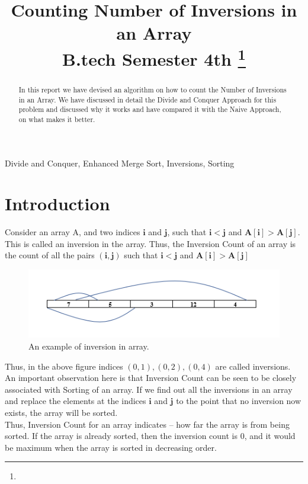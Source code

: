 \documentclass[conference]{IEEEtran}
\begin{document}
\title{Counting Number of Inversions in an Array\\
{\footnotesize B.tech Semester 4th}
\thanks{}
}

\author{
\and
{}
\and
{}
}

\maketitle

\noindent \begin{abstract}
In this report we have devised an algorithm on how to count the Number of Inversions in an Array.
We have discussed in detail the Divide and Conquer Approach for this problem and discussed why it works and have compared it with the Naive Approach, on what makes it better.
\end{abstract}

\noindent \begin{IEEEkeywords}
Divide and Conquer, Enhanced Merge Sort, Inversions, Sorting
\end{IEEEkeywords}

\section{\textbf{Introduction}}
\noindent Consider an array A, and two indices $\bm{i}$ and $\bm{j}$, such that $\bm{i}<\bm{j}$ and $\bm{A[i]} > \bm{A[j]}$. This is called an inversion in the array. Thus, the Inversion Count of an array is the count of all the pairs $\bm{(i,j)}$ such that $\bm{i}<\bm{j}$ and $\bm{A[i]}>\bm{A[j]}$ \\

\begin{figure}[htbp]
\centerline{\includegraphics{inversion.png}}
\caption{An example of inversion in array.}
\label{fig}
\end{figure}

\noindent Thus, in the above figure indices $(0,1) , (0,2) , (0,4)$ are called inversions. \\
An important observation here is that Inversion Count can be seen to be closely associated with Sorting of an array. If we find out all the inversions in an array and replace the elements at the indices $\bm{i}$ and $\bm{j}$ to the point that no inversion now exists, the array will be sorted. \\
Thus, Inversion Count for an array indicates – how far the array is from being sorted. If the array is already sorted, then the inversion count is 0, and it would be maximum when the array is sorted in decreasing order. \\
\end{document}
